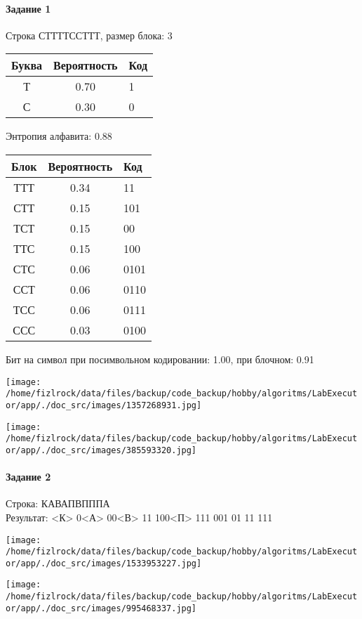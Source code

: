\documentclass[a4paper, 12pt]{article}
\begin{document}
\paragraph{Задание 1}

Строка СТТТТССТТТ, размер блока: 3
\begin{center}
 \begin{tabular}{ |c|c|l| } 
  \hline
     Буква & Вероятность & Код\\ \hline
Т & 0.70 & 1\\\hline
С & 0.30 & 0
\\ \hline \end{tabular}
\end{center}
Энтропия алфавита: 0.88
\begin{center}
 \begin{tabular}{ |c|c|l| } 
  \hline
     Блок & Вероятность & Код\\ \hline
ТТТ & 0.34 & 11\\\hline
СТТ & 0.15 & 101\\\hline
ТСТ & 0.15 & 00\\\hline
ТТС & 0.15 & 100\\\hline
СТС & 0.06 & 0101\\\hline
ССТ & 0.06 & 0110\\\hline
ТСС & 0.06 & 0111\\\hline
ССС & 0.03 & 0100
\\ \hline \end{tabular}
\end{center}
Бит на символ при посимвольном кодировании: 1.00, при блочном: 0.91

\texttt{[image: /home/fizlrock/data/files/backup/code\_backup/hobby/algoritms/LabExecutor/app/./doc\_src/images/1357268931.jpg]}

\texttt{[image: /home/fizlrock/data/files/backup/code\_backup/hobby/algoritms/LabExecutor/app/./doc\_src/images/385593320.jpg]}
\pagebreak
\paragraph{Задание 2}

Строка: 
КАВАПВПППА\\
Результат: <К> 0<А> 00<В> 11 100<П> 111 001 01 11 111

\texttt{[image: /home/fizlrock/data/files/backup/code\_backup/hobby/algoritms/LabExecutor/app/./doc\_src/images/1533953227.jpg]}

\texttt{[image: /home/fizlrock/data/files/backup/code\_backup/hobby/algoritms/LabExecutor/app/./doc\_src/images/995468337.jpg]}
\end{document}
